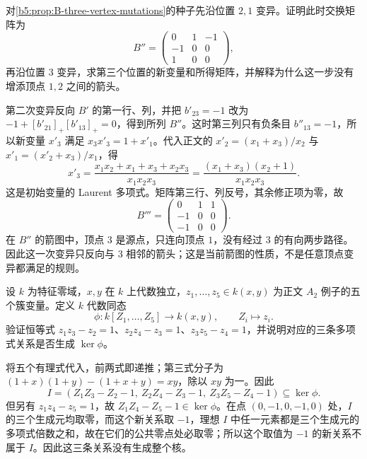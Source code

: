\begin{exercise}\label{b5:ex:B:06}
	对\cref{b5:prop:B-three-vertex-mutations}的种子先沿位置 \(2,1\) 变异。证明此时交换矩阵为
	\[
		B''=\begin{pmatrix}0&1&-1\\-1&0&0\\1&0&0\end{pmatrix},
	\]
	再沿位置 \(3\) 变异，求第三个位置的新变量和所得矩阵，并解释为什么这一步没有增添顶点 \(1,2\) 之间的箭头。
\end{exercise}
\begin{solution}
	第二次变异反向 \(B'\) 的第一行、列，并把 \(b'_{23}=-1\) 改为 \(-1+[b'_{21}]_+[b'_{13}]_+=0\)，得到所列 \(B''\)。这时第三列只有负条目 \(b''_{13}=-1\)，所以新变量 \(x'_3\) 满足 \(x_3x'_3=1+x'_1\)。代入正文的 \(x'_2=(x_1+x_3)/x_2\) 与 \(x'_1=(x'_2+x_3)/x_1\)，得
	\[
		x'_3=\frac{x_1x_2+x_1+x_3+x_2x_3}{x_1x_2x_3} =\frac{(x_1+x_3)(x_2+1)}{x_1x_2x_3}.
	\]
	这是初始变量的 Laurent 多项式。矩阵第三行、列反号，其余修正项为零，故
	\[
		B'''=\begin{pmatrix}0&1&1\\-1&0&0\\-1&0&0\end{pmatrix}.
	\]
	在 \(B''\) 的箭图中，顶点 \(3\) 是源点，只连向顶点 \(1\)，没有经过 \(3\) 的有向两步路径。因此这一次变异只反向与 \(3\) 相邻的箭头；这是当前箭图的性质，不是任意顶点变异都满足的规则。
\end{solution}

\begin{exercise}\label{b5:ex:B:07}
	设 \(k\) 为特征零域，\(x,y\) 在 \(k\) 上代数独立，\(z_1,\ldots,z_5\in k(x,y)\) 为正文 \(A_2\) 例子的五个簇变量。定义 \(k\) 代数同态
	\[
		\phi:k[Z_1,\ldots,Z_5]\longrightarrow k(x,y),\qquad Z_i\longmapsto z_i.
	\]
	验证恒等式 \(z_1z_3-z_2=1\)、\(z_2z_4-z_3=1\)、\(z_3z_5-z_4=1\)，并说明对应的三条多项式关系是否生成 \(\ker\phi\)。
\end{exercise}
\begin{solution}
	将五个有理式代入，前两式即递推；第三式分子为 \((1+x)(1+y)-(1+x+y)=xy\)，除以 \(xy\) 为一。因此
	\[
		I=(Z_1Z_3-Z_2-1,\ Z_2Z_4-Z_3-1,\ Z_3Z_5-Z_4-1) \subseteq\ker\phi.
	\]
	但另有 \(z_1z_4-z_5=1\)，故 \(Z_1Z_4-Z_5-1\in\ker\phi\)。在点 \((0,-1,0,-1,0)\) 处，\(I\) 的三个生成元均取零，而这个新关系取 \(-1\)，理想 \(I\) 中任一元素都是三个生成元的多项式倍数之和，故在它们的公共零点处必取零；所以这个取值为 \(-1\) 的新关系不属于 \(I\)。因此这三条关系没有生成整个核。
\end{solution}

